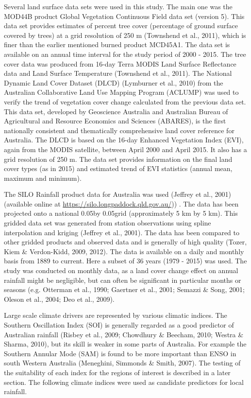 \documentclass[fleqn,10pt,lineno]{wlpeerj} %
\theoremstyle{definition}
\theoremstyle{definition}
\theoremstyle{definition}
\theoremstyle{remark}
\begin{document}
Several land surface data sets were used in this study. The main one was
the MOD44B product Global Vegetation Continuous Field data set (version
5). This data set provides estimates of percent tree cover (percentage
of ground surface covered by trees) at a grid resolution of 250 m
(Townshend et al., 2011), which is finer than the earlier mentioned
burned product MCD45A1. The data set is available on an annual time
interval for the study period of 2000 - 2015. The tree cover data was
produced from 16-day Terra MODIS Land Surface Reflectance data and Land
Surface Temperature (Townshend et al., 2011). The National Dynamic Land
Cover Dataset (DLCD) (Lymburner et al., 2010) from the Australian
Collaborative Land Use Mapping Program (ACLUMP) was used to verify the
trend of vegetation cover change calculated from the previous data set.
This data set, developed by Geoscience Australia and Australian Bureau
of Agricultural and Resource Economics and Sciences (ABARES), is the
first nationally consistent and thematically comprehensive land cover
reference for Australia. The DLCD is based on the 16-day Enhanced
Vegetation Index (EVI), again from the MODIS satellite, between April
2000 and April 2015. It also has a grid resolution of 250 m. The data
set provides information on the final land cover types (as in 2015) and
estimated trend of EVI statistics (annual mean, maximum and minimum).

The SILO Rainfall product data for Australia was used (Jeffrey et al.,
2001) (available online at \url{https://silo.longpaddock.qld.gov.au/}))
. The data has been projected onto a national 0.05\textdegree  by
0.05\textdegree  grid (approximately 5 km by 5 km). This gridded data
set was generated from station observations using spline interpolation
and kriging (Jeffrey et al., 2001). The data has been compared to other
gridded products and observed data and is generally of high quality
(Tozer, Kiem \& Verdon-Kidd, 2009, 2012). The data is available on a
daily and monthly basis from 1889 to current. Here a subset of 36 years
(1979 - 2015) was used. The study was conducted on monthly data, as a
land cover change effect on annual rainfall might be negligible, but can
often be significant in particular months or seasons (e.g. Otterman et
al., 1990; Gaertner et al., 2001; Semazzi \& Song, 2001; Oleson et al.,
2004; Deo et al., 2009).

Large scale climate drivers are represented by various climatic indices.
The Southern Oscillation Index (SOI) is generally regarded as a good
predictor of Australian rainfall (Risbey et al., 2009; Chowdhury \&
Beecham, 2010; Westra \& Sharma, 2010), but its skill is weaker in some
parts of Australia. For example the Southern Annular Mode (SAM) is found
to be more important than ENSO in south Western Australia (Meneghini,
Simmonds \& Smith, 2007). The testing of the suitability of each index
for the regions of interest is described in a later section. The
following climate indices were used as candidate predictors for local
rainfall.
\end{document}
